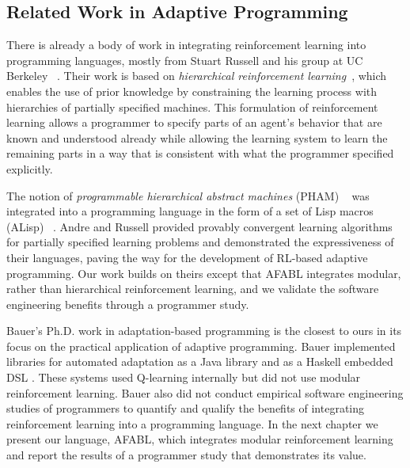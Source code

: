 \subsection{Related Work in Adaptive Programming}


There is already a body of work in integrating reinforcement learning into programming languages, mostly from Stuart Russell and his group at UC Berkeley ~\cite{andre2001programmable,andre2002state}.  Their work is based on {\it hierarchical reinforcement learning}~\cite{parr1998reinforcement,dietterich1998maxq}, which enables the use of prior knowledge by constraining the learning process with hierarchies of partially specified machines.  This formulation of reinforcement learning allows a programmer to specify parts of an agent's behavior that are known and understood already while allowing the learning system to learn the remaining parts in a way that is consistent with what the programmer specified explicitly.

The notion of {\em programmable hierarchical abstract machines} (PHAM) ~\cite{andre2001programmable} was integrated into a programming language in the form of a set of Lisp macros (ALisp) ~\cite{andre2002state}. Andre and Russell provided provably convergent learning algorithms for partially specified learning problems and demonstrated the expressiveness of their languages, paving the way for the development of RL-based adaptive programming. Our work builds on theirs except that AFABL integrates modular, rather than hierarchical reinforcement learning, and we validate the software engineering benefits through a programmer study.


Bauer's Ph.D. work in adaptation-based programming \cite{bauer2013adaptation} is the closest to ours in its focus on the practical application of adaptive programming. Bauer implemented libraries for automated adaptation as a Java library \cite{bauer2011adaptation} and as a Haskell embedded DSL \cite{bauer2011adaptation-haskell}. These systems used Q-learning internally but did not use modular reinforcement learning. Bauer also did not conduct empirical software engineering studies of programmers to quantify and qualify the benefits of integrating reinforcement learning into a programming language. In the next chapter we present our language, AFABL, which integrates modular reinforcement learning and report the results of a programmer study that demonstrates its value.
